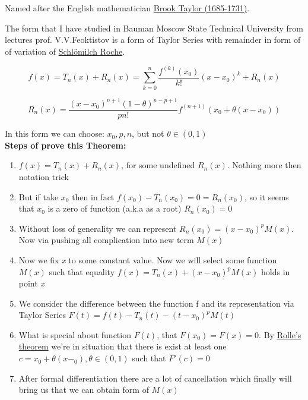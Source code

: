 \documentclass[12pt,a4paper]{article}
\theoremstyle{plain}
\begin{document}
Named after the English mathematician \href{https://en.wikipedia.org/wiki/Brook_Taylor}{Brook Taylor (1685-1731)}.

The form that I have studied in Bauman Moscow State Technical University from lectures prof. V.V.Feoktistov is a form of Taylor Series with remainder in form of of variation of \href{https://mathworld.wolfram.com/SchloemilchRemainder.html}{Schlömilch Roche}.

\begin{equation}
	f(x)=T_n(x)+R_n(x)=\sum_{k=0}^{n} \dfrac{f^{(k)}(x_0)}{k!}(x-x_0)^k+R_n(x)
\end{equation}

\begin{equation}
	R_n(x)=\dfrac{(x-x_0)^{n+1}(1-\theta)^{n-p+1}}{pn!}f^{(n+1)}(x_0+\theta(x-x_0))	
\end{equation}

In this form we can choose: \textbf{$x_0,p,n$}, but not $\theta \in (0,1)$\\

\textbf{Steps of prove this Theorem:}
\begin{enumerate}
	\item $f(x)=T_n(x)+R_n(x)$, for some undefined $R_n(x)$. Nothing more then notation trick
	\item But if take $x_0$ then in fact $f(x_0)-T_n(x_0)=0=R_n(x_0)$, so it seems that $x_0$ is a zero of function (a.k.a as a root) $R_n(x_0)=0$
	\item Without loss of generality we can represent $R_n(x_0)=(x-x_0)^pM(x)$. Now via pushing all complication into new term $M(x)$
	\item Now we fix \textit{x} to some constant value. Now we will select some function $M(x)$ such that equality 
	$f(x)=T_n(x)+(x-x_0)^pM(x)$ holds in point \textit{x}
	\item We consider the difference between the function f and its representation via Taylor Series $F(t)=f(t)-T_n(t)-(t-x_0)^pM(t)$ 
	\item What is special about function $F(t)$, that $F(x_0)=F(x)=0$. By \href{https://en.wikipedia.org/wiki/Rolle\%27s_theorem}{Rolle's theorem} we're in situation that there is exist at least one $c=x_0+\theta(x-_0), \theta \in (0,1)$ such that $F'(c)=0$
	\item After formal differentiation there are a lot of cancellation which finally will bring us that we can obtain form of $M(x)$	
\end{enumerate}
\end{document}
